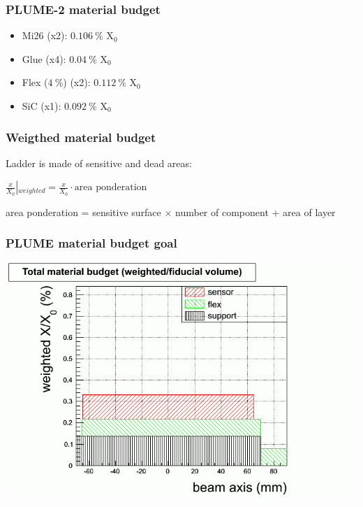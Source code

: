 \documentclass{beamer}
\begin{document}

\begin{frame}[plain]
  \frametitle{PLUME-2 material budget}

  \begin{itemize}
    \item Mi26 (x2): $0.106~\%$ X$_0$
    \item Glue (x4): $0.04~\%$ X$_0$
    \item Flex ($4~\%$) (x2): $0.112~\%$ X$_0$
    \item SiC (x1): $0.092~\%$ X$_0$ 
  \end{itemize}
\end{frame}

\begin{frame}[plain]
  \frametitle{Weigthed material budget}

  \begin{center}
  Ladder is made of sensitive and dead areas:

  $\frac{x}{X_0}\left|_{weighted}\right. = \frac{x}{X_0} \cdot \text{area ponderation}$

  area ponderation = sensitive surface $\times$ number of component + area of layer
  \end{center}

\end{frame}

\begin{frame}
  \frametitle{PLUME material budget goal}

  \begin{center}
    \includegraphics[width = \textwidth]{Pictures/plumeGoal_MaterialBudget_weighted.png}
  \end{center}
\end{frame}
\end{document}
